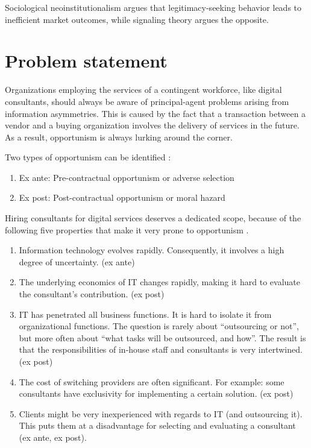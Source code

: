 \documentclass[12pt]{article}
\providecommand{\tightlist}{%
  \setlength{\itemsep}{0pt}\setlength{\parskip}{0pt}}
\begin{document}
Sociological neoinstitutionalism argues that legitimacy-seeking behavior
leads to inefficient market outcomes, while signaling theory argues the
opposite.

\hypertarget{problem-statement}{%
\section{Problem statement}\label{problem-statement}}

Organizations employing the services of a contingent workforce, like
digital consultants, should always be aware of principal-agent problems
arising from information asymmetries. This is caused by the fact that a
transaction between a vendor and a buying organization involves the
delivery of services in the future. As a result, opportunism is always
lurking around the corner.

Two types of opportunism can be identified \citet[242]{clark1993}:

\begin{enumerate}
\def\labelenumi{\arabic{enumi}.}
\tightlist
\item
  Ex ante: Pre-contractual opportunism or adverse selection
\item
  Ex post: Post-contractual opportunism or moral hazard
\end{enumerate}

Hiring consultants for digital services deserves a dedicated scope,
because of the following five properties that make it very prone to
opportunism \citep[ 207]{leslie1995}.

\begin{enumerate}
\def\labelenumi{\arabic{enumi}.}
\tightlist
\item
  Information technology evolves rapidly. Consequently, it involves a
  high degree of uncertainty. (ex ante)
\item
  The underlying economics of IT changes rapidly, making it hard to
  evaluate the consultant's contribution. (ex post)
\item
  IT has penetrated all business functions. It is hard to isolate it
  from organizational functions. The question is rarely about
  ``outsourcing or not'', but more often about ``what tasks will be
  outsourced, and how''. The result is that the responsibilities of
  in-house staff and consultants is very intertwined. (ex post)
\item
  The cost of switching providers are often significant. For example:
  some consultants have exclusivity for implementing a certain solution.
  (ex post)
\item
  Clients might be very inexperienced with regards to IT (and
  outsourcing it). This puts them at a disadvantage for selecting and
  evaluating a consultant (ex ante, ex post).
\end{enumerate}
\end{document}
